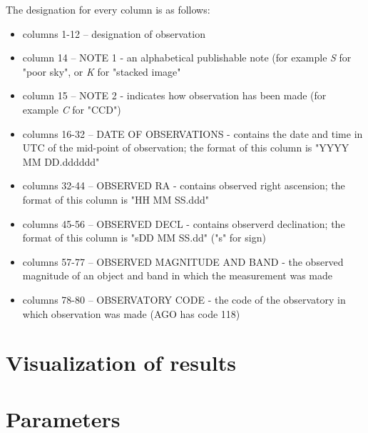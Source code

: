 	The designation for every column is as follows:
	
	\begin{itemize}
		\item columns 1-12 -- designation of observation
		\item column 14 -- NOTE 1 - an alphabetical publishable note (for example \emph{S} for "poor sky", or \emph{K} for "stacked image"
		\item column 15 -- NOTE 2 - indicates how observation has been made (for example \emph{C} for "CCD")
		\item columns 16-32 -- DATE OF OBSERVATIONS - contains the date and time in UTC of the mid-point of observation; the format of this column is "YYYY MM DD.dddddd"
		\item columns 32-44 -- OBSERVED RA - contains observed right ascension; the format of this column is "HH MM SS.ddd"
		\item columns 45-56 -- OBSERVED DECL - contains observerd declination; the format of this column is "sDD MM SS.dd" ("s" for sign)
		\item columns 57-77 -- OBSERVED MAGNITUDE AND BAND - the observed magnitude of an object and band in which the measurement was made
		\item columns 78-80 -- OBSERVATORY CODE - the code of the observatory in which observation was made (AGO has code 118)
	\end{itemize}

	\citep{mpc}

\section{Visualization of results}\label{sec:visualization}

\section{Parameters}\label{sec:parameters}

